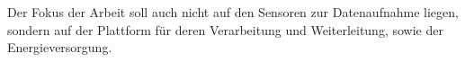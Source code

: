 Der Fokus der Arbeit soll auch nicht auf den Sensoren zur Datenaufnahme liegen, sondern auf der Plattform für deren Verarbeitung und Weiterleitung, sowie der Energieversorgung.




    










